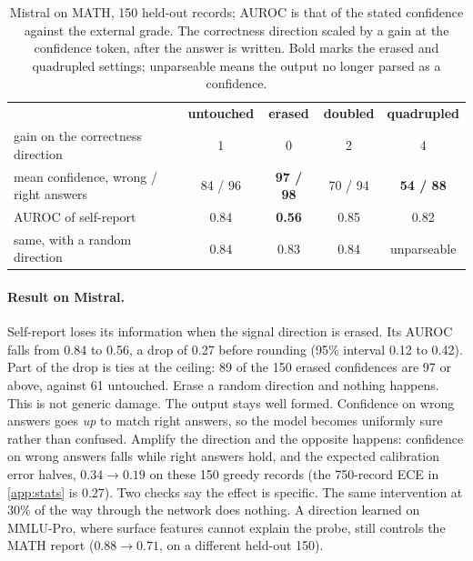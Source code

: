 \documentclass{article}
\begin{document}
\begin{table}[t]
\caption{Mistral on MATH, 150 held-out records; AUROC is that of the stated confidence against the external grade. The correctness direction scaled by a gain at the confidence token, after the answer is written. Bold marks the erased and quadrupled settings; unparseable means the output no longer parsed as a confidence.}
\label{tab:ablation}
\centering
\small
\begin{tabular}{lcccc}
\toprule
 & \textbf{untouched} & \textbf{erased} & \textbf{doubled} & \textbf{quadrupled} \\
gain on the correctness direction & 1 & 0 & 2 & 4 \\
\midrule
mean confidence, wrong / right answers & 84 / 96 & \textbf{97 / 98} & 70 / 94 & \textbf{54 / 88} \\
AUROC of self-report & 0.84 & \textbf{0.56} & 0.85 & 0.82 \\
same, with a random direction & 0.84 & 0.83 & 0.84 & unparseable \\
\bottomrule
\end{tabular}
\end{table}

\paragraph{Result on Mistral.}
Self-report loses its information when the signal direction is erased.
Its AUROC falls from 0.84 to 0.56, a drop of 0.27 before rounding (95\% interval 0.12 to 0.42).
Part of the drop is ties at the ceiling: 89 of the 150 erased confidences are 97 or above, against 61 untouched.
Erase a random direction and nothing happens.
This is not generic damage.
The output stays well formed.
Confidence on wrong answers goes \emph{up} to match right answers, so the model becomes uniformly sure rather than confused.
Amplify the direction and the opposite happens: confidence on wrong answers falls while right answers hold, and the expected calibration error halves, $0.34 \to 0.19$ on these 150 greedy records (the 750-record ECE in \cref{app:stats} is 0.27).
Two checks say the effect is specific.
The same intervention at 30\% of the way through the network does nothing.
A direction learned on MMLU-Pro, where surface features cannot explain the probe, still controls the MATH report ($0.88 \to 0.71$, on a different held-out 150).
\end{document}
